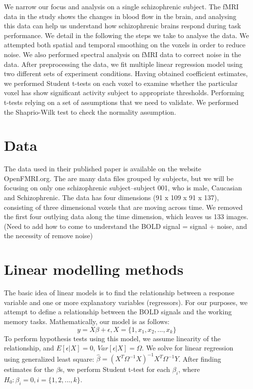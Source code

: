 \documentclass[11pt]{article} \usepackage{graphicx} \graphicspath{ {images/} }
\begin{document}
We narrow our focus and analysis on a single schizophrenic
subject. The fMRI data in the study shows the changes in
blood flow in the brain, and analysing this data can help us understand how
schizophrenic brains respond during task performance. We detail in the following the steps
we take to analyse the data. We attempted both spatial and temporal smoothing on
the voxels in order to reduce noise. We also performed spectral analysis on fMRI data to
correct noise in the data. After preprocessing the data, we fit
multiple linear regression model using two different sets of experiment
conditions. Having obtained coefficient estimates, we performed Student t-tests
on each voxel to examine whether the particular voxel has show significant
activity subject to appropriate thresholds. Performing t-tests relying on a set
of assumptions that we need to validate. We performed the Shaprio-Wilk test to
check the normality assumption.

\section{Data}

The data used in their published paper is available on the website OpenFMRI.org.
The are many data files grouped by subjects, but we will be focusing on only one
schizophrenic subject--subject 001, who is male, Caucasian and Schizophrenic.
The data has four dimensions (91 x 109 x 91 x 137), consisting of three dimensional voxels that are moving
across time. We removed the first four outlying data along the time dimension,
which leaves us 133 images. (Need to add how to come to understand the BOLD
signal = signal + noise, and the necessity of remove noise)

\section{Linear modelling methods} 

The basic idea of linear models is to find the relationship between a response
variable and one or more explanatory variables (regressors). For our purposes,
we attempt to define a relationship between the BOLD signals and the working
memory tasks. Mathematically, our model is as follows:
 $$ y = X \beta + \epsilon, X = \{1, x_1, x_2, ..., x_k\}$$ To perform
 hypothesis tests using this model, we assume linearity of the relationship, and
 $E [\epsilon | X ] = 0$, $Var [ \epsilon | X ] = \Omega$. We solve for linear
 regression using generalized least square: $\hat{\beta} = (X^T \Omega^{-1}
 X)^{-1} X^T \Omega^{-1} Y$. After finding estimates for the $\beta$s, we perform Student
 t-test for each $\beta_i$, where $H_0: \beta_i = 0, i = \{1, 2, ..., k\}$.
\end{document}
